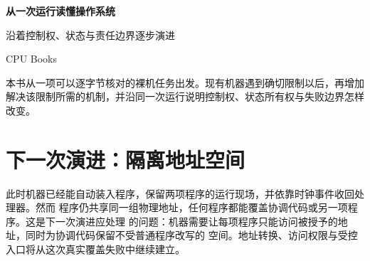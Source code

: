 \documentclass[UTF8,openany,zihao=5,fontset=none]{ctexbook}
\begin{document}
\frontmatter
\begin{titlepage}
\thispagestyle{empty}
\vspace*{2.25cm}
{\Huge\bfseries\color{BookNavy} 从一次运行读懂操作系统\par}
\vspace{0.72cm}
{\Large\color{BookAccent} 沿着控制权、状态与责任边界逐步演进\par}
\vspace{1.18cm}
{\large CPU Books\par}
\vfill
{\small\color{BookMuted}
本书从一项可以逐字节核对的裸机任务出发。现有机器遇到确切限制以后，再增加
解决该限制所需的机制，并沿同一次运行说明控制权、状态所有权与失败边界怎样改变。\par}
\end{titlepage}



\setcounter{tocdepth}{1}
\tableofcontents

\mainmatter





\backmatter
\chapter*{下一次演进：隔离地址空间}

此时机器已经能自动装入程序，保留两项程序的运行现场，并依靠时钟事件收回处理器。然而
程序仍共享同一组物理地址，任何程序都能覆盖协调代码或另一项程序。这是下一次演进应处理
的问题：机器需要让每项程序只能访问被授予的地址，同时为协调代码保留不受普通程序改写的
空间。地址转换、访问权限与受控入口将从这次真实覆盖失败中继续建立。
\end{document}
